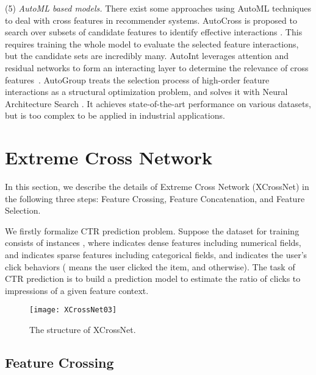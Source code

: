 \documentclass[letterpaper]{article} \usepackage{aaai21}  \usepackage{times}  \usepackage{helvet} \usepackage{courier}  \usepackage[hyphens]{url}  \usepackage{graphicx} \urlstyle{rm} \def\UrlFont{\rm}  \usepackage{natbib}  \usepackage{caption} \frenchspacing  \setlength{\pdfpagewidth}{8.5in}  \setlength{\pdfpageheight}{11in}  \usepackage{graphicx}
\begin{document}
(5) {\em AutoML based models.} There exist some approaches using AutoML techniques to deal with cross features in recommender systems. AutoCross is proposed to search over subsets of candidate features to identify effective interactions . This requires training the whole model to evaluate the selected feature interactions, but the candidate sets are incredibly many. AutoInt leverages attention and residual networks to form an interacting layer to determine the relevance of cross features~. AutoGroup treats the selection process of high-order feature interactions as a structural optimization problem, and solves it with Neural Architecture Search . It achieves state-of-the-art performance on various datasets, but is too complex to be applied in industrial applications.




\vspace{-0.2cm}
\section{Extreme Cross Network}
\vspace{-0.1cm}
In this section, we describe the details of Extreme Cross Network (XCrossNet) in the following three steps: Feature Crossing, Feature Concatenation, and Feature Selection. 

We firstly formalize CTR prediction problem.
 Suppose the dataset for training consists of  instances , where  indicates dense features including  numerical fields, and  indicates sparse features including  categorical fields, and  indicates the user's click behaviors ( means the user clicked the item, and  otherwise). The task of CTR prediction is to build a prediction model  to estimate the ratio of clicks to impressions of a given feature context.






\begin{figure*}[!t]
	\centering
	\texttt{[image: XCrossNet03]} \caption{The structure of XCrossNet.}
	\label{fig2}
	\vspace{-0.4cm}
\end{figure*}


\vspace{-0.2cm}
\subsection{Feature Crossing}
\vspace{-0.1cm}
\end{document}
